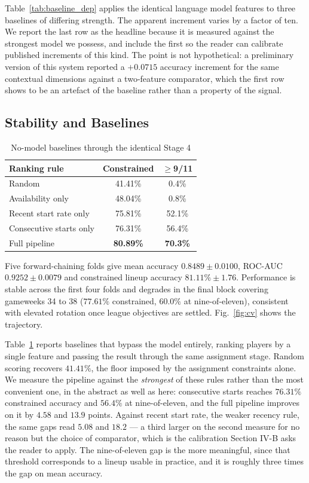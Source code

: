 \documentclass[conference]{IEEEtran}
\begin{document}
Table~\ref{tab:baseline_dep} applies the identical language model features to three baselines of differing strength. The apparent increment varies by a factor of ten. We report the last row as the headline because it is measured against the strongest model we possess, and include the first so the reader can calibrate published increments of this kind. The point is not hypothetical: a preliminary version of this system reported a $+0.0715$ accuracy increment for the same contextual dimensions against a two-feature comparator, which the first row shows to be an artefact of the baseline rather than a property of the signal.

\subsection{Stability and Baselines}

\begin{table}[!t]
\centering
\small
\caption{No-model baselines through the identical Stage 4}
\label{tab:baselines}
\begin{tabular}{@{}lcc@{}}
\toprule
\textbf{Ranking rule} & \textbf{Constrained} & \textbf{$\geq$9/11} \\
\midrule
Random                       & 41.41\% & 0.4\% \\
Availability only            & 48.04\% & 0.8\% \\
Recent start rate only       & 75.81\% & 52.1\% \\
Consecutive starts only      & 76.31\% & 56.4\% \\
\midrule
Full pipeline                & \textbf{80.89\%} & \textbf{70.3\%} \\
\bottomrule
\end{tabular}
\end{table}

Five forward-chaining folds give mean accuracy $0.8489 \pm 0.0100$, ROC-AUC $0.9252 \pm 0.0079$ and constrained lineup accuracy $81.11\% \pm 1.76$. Performance is stable across the first four folds and degrades in the final block covering gameweeks 34 to 38 ($77.61\%$ constrained, $60.0\%$ at nine-of-eleven), consistent with elevated rotation once league objectives are settled. Fig.~\ref{fig:cv} shows the trajectory.

Table~\ref{tab:baselines} reports baselines that bypass the model entirely, ranking players by a single feature and passing the result through the same assignment stage. Random scoring recovers $41.41\%$, the floor imposed by the assignment constraints alone. We measure the pipeline against the \emph{strongest} of these rules rather than the most convenient one, in the abstract as well as here: consecutive starts reaches $76.31\%$ constrained accuracy and $56.4\%$ at nine-of-eleven, and the full pipeline improves on it by $4.58$ and $13.9$ points. Against recent start rate, the weaker recency rule, the same gaps read $5.08$ and $18.2$ --- a third larger on the second measure for no reason but the choice of comparator, which is the calibration Section IV-B asks the reader to apply. The nine-of-eleven gap is the more meaningful, since that threshold corresponds to a lineup usable in practice, and it is roughly three times the gap on mean accuracy.
\end{document}
